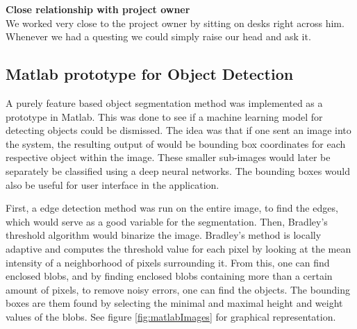 \textbf{Close relationship with project owner} \\
We worked very close to the project owner by sitting on desks right across him. Whenever we had a questing we could simply raise our head and ask it.

\subsection{Matlab prototype for Object Detection}
A purely feature based object segmentation method was implemented as a prototype in Matlab. This was done to see if a machine learning model for detecting objects could be dismissed. 
The idea was that if one sent an image into the system, the resulting output of would be bounding box coordinates for each respective object within the image. These smaller sub-images would later be separately be classified using a deep neural networks. The bounding boxes would also be useful for user interface in the application. 

First, a edge detection method was run on the entire image, to find the edges, which would serve as a good variable for the segmentation. Then, Bradley's threshold algorithm \cite{Bradley} would binarize the image. Bradley's method is locally adaptive and computes the threshold value for each pixel by looking at the mean intensity of a neighborhood of pixels surrounding it.  From this, one can find enclosed blobs, and by finding enclosed blobs containing more than a certain amount of pixels, to remove noisy errors, one can find the objects. The bounding boxes are them found by selecting the minimal and maximal height and weight values of the blobs. See figure \ref{fig:matlabImages} for graphical representation.

